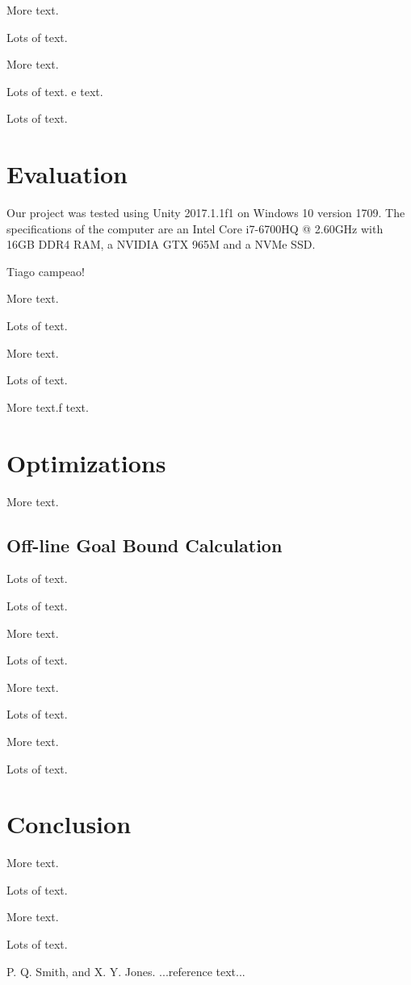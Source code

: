 \documentclass{sigplanconf}[10pt]
\begin{document}
More text.

Lots of text.

More text.

Lots of text.
e text.

Lots of text.
\section{Evaluation}
\label{eval}

Our project was tested using Unity 2017.1.1f1 on Windows 10 version 1709. The specifications of the computer are an Intel Core i7-6700HQ @ 2.60GHz with 16GB DDR4 RAM, a NVIDIA GTX 965M and a NVMe SSD.

Tiago campeao!

More text.

Lots of text.

More text.

Lots of text.

More text.f text.


\section{Optimizations}
\label{optimi}
More text.
\subsection{Off-line Goal Bound Calculation}
Lots of text.

Lots of text.

More text.

Lots of text.

More text.

Lots of text.

More text.

Lots of text.
\section{Conclusion}
\label{conclusion}
More text.

Lots of text.

More text.

Lots of text.






\begin{thebibliography}{}
\softraggedright

P. Q. Smith, and X. Y. Jones. ...reference text...

\end{thebibliography}
\end{document}
